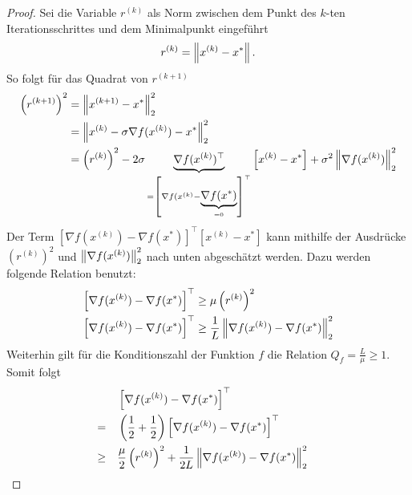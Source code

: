\begin{proof}
  Sei die Variable $r^{(k)}$ als Norm zwischen dem Punkt des $k$-ten Iterationsschrittes und dem Minimalpunkt eingeführt
  \begin{equation*}
    r^{(k)} = \left\lVert x^{(k)}-x^\ast\right\rVert \text{.}
  \end{equation*}
  So folgt für das Quadrat von $r^{(k+1)}$
  \begin{gather*}
          \begin{aligned}
            \left(r^{(k+1)}\right)^2 & = \left\lVert x^{(k+1)}-x^\ast\right\rVert^2_2\\
            & = \left\lVert x^{(k)}-\sigma \nabla f(x^{(k)})-x^\ast\right\rVert^2_2 \\
            & = \left(r^{(k)}\right)^2 - 2\sigma \underbrace{\nabla f(x^{(k)})^\top}_{= \left[\nabla f(x^{(k)}-\underbrace{\nabla f(x^\ast)}_{=0}\right]^\top} \left[x^{(k)}-x^\ast\right] + \sigma^2 \left\lVert\nabla f(x^{(k)})\right\rVert^2_2
          \end{aligned}
    \end{gather*}
    Der Term $\left[\nabla f(x^{(k)})-\nabla f(x^\ast)\right]^\top \left[x^{(k)}-x^\ast\right]$ kann mithilfe der Ausdrücke $\left(r^{(k)}\right)^2$ und $\left\lVert\nabla f(x^{(k)})\right\rVert^2_2$ nach unten abgeschätzt werden. Dazu werden folgende Relation benutzt:
    \begin{gather*}
            \begin{aligned}
              \left[\nabla f(x^{(k)})-\nabla f(x^\ast)\right]^\top & \geq \mu \left(r^{(k)}\right)^2 \\
              \left[\nabla f(x^{(k)})-\nabla f(x^\ast)\right]^\top & \geq \frac{1}{L} \left\lVert\nabla f(x^{(k)})-\nabla f(x^\ast)\right\rVert^2_2 \\
            \end{aligned}
    \end{gather*}
    Weiterhin gilt für die Konditionszahl der Funktion $f$ die Relation $Q_f = \frac{L}{\mu} \geq 1$. \\
    Somit folgt
    \begin{gather*}
            \begin{aligned}
              & \left[\nabla f(x^{(k)})-\nabla f(x^\ast)\right]^\top & \\
              = \quad & \left(\frac{1}{2}+\frac{1}{2}\right) \left[\nabla f(x^{(k)})-\nabla f(x^\ast)\right]^\top & \\
              \geq \quad & \frac{\mu}{2} \left(r^{(k)}\right)^2 + \frac{1}{2L}\norm{\nabla f(x^{(k)})-\nabla f(x^\ast)}^2_2 & \\

\end{aligned}
\end{gather*}
\end{proof}
